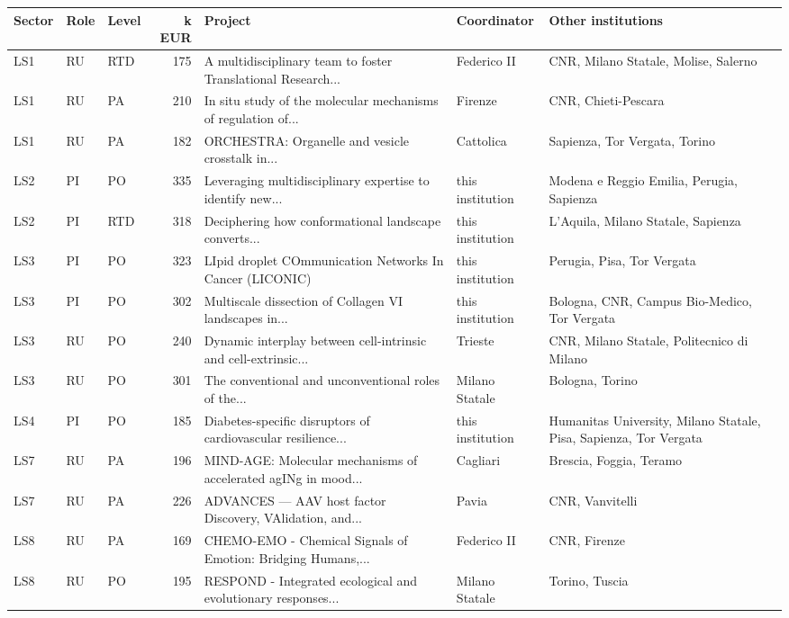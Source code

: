 \documentclass[11pt,a4paper]{article}
\begin{document}
{\footnotesize
\begin{longtable}{lllrp{4.2cm}p{2cm}p{3.2cm}}
\toprule
Sector & Role & Level & k EUR & Project & Coordinator & Other institutions \\
\midrule
\endhead
LS1 & RU & RTD & 175 & A multidisciplinary team to foster Translational Research... & Federico II & CNR, Milano Statale, Molise, Salerno \\
LS1 & RU & PA & 210 & In situ study of the molecular mechanisms of regulation of... & Firenze & CNR, Chieti-Pescara \\
LS1 & RU & PA & 182 & ORCHESTRA: Organelle and vesicle crosstalk in... & Cattolica & Sapienza, Tor Vergata, Torino \\
LS2 & PI & PO & 335 & Leveraging multidisciplinary expertise to identify new... & this institution & Modena e Reggio Emilia, Perugia, Sapienza \\
LS2 & PI & RTD & 318 & Deciphering how conformational landscape converts... & this institution & L'Aquila, Milano Statale, Sapienza \\
LS3 & PI & PO & 323 & LIpid droplet COmmunication Networks In Cancer (LICONIC) & this institution & Perugia, Pisa, Tor Vergata \\
LS3 & PI & PO & 302 & Multiscale dissection of Collagen VI landscapes in... & this institution & Bologna, CNR, Campus Bio-Medico, Tor Vergata \\
LS3 & RU & PO & 240 & Dynamic interplay between cell-intrinsic and cell-extrinsic... & Trieste & CNR, Milano Statale, Politecnico di Milano \\
LS3 & RU & PO & 301 & The conventional and unconventional roles of the... & Milano Statale & Bologna, Torino \\
LS4 & PI & PO & 185 & Diabetes-specific disruptors of cardiovascular resilience... & this institution & Humanitas University, Milano Statale, Pisa, Sapienza, Tor Vergata \\
LS7 & RU & PA & 196 & MIND-AGE: Molecular mechanisms of accelerated agINg in mood... & Cagliari & Brescia, Foggia, Teramo \\
LS7 & RU & PA & 226 & ADVANCES — AAV host factor Discovery, VAlidation, and... & Pavia & CNR, Vanvitelli \\
LS8 & RU & PA & 169 & CHEMO-EMO - Chemical Signals of Emotion: Bridging Humans,... & Federico II & CNR, Firenze \\
LS8 & RU & PO & 195 & RESPOND - Integrated ecological and evolutionary responses... & Milano Statale & Torino, Tuscia \\

\end{longtable}}
\end{document}
